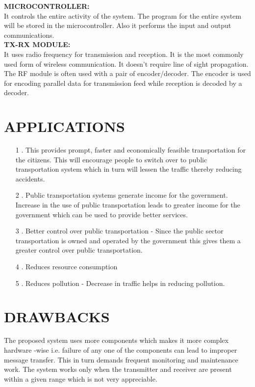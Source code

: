 \documentclass[12pt,a4paper,oneside]{report}
\begin{document}
\begin{onehalfspacing}
\textbf{MICROCONTROLLER:}\\
 It controls the entire activity of the system. The program for the entire system will be stored in the microcontroller. Also it performs the input and output communications. \\
 
\textbf{TX-RX  MODULE:}\\
It uses radio frequency for transmission and reception. It is the most commonly used form of wireless communication. It doesn't require line of sight propagation. The RF module is often used with a pair of encoder/decoder. The encoder is used for encoding parallel data for transmission feed while reception is decoded by a decoder.  \\



\section{APPLICATIONS}
\par
\hspace{.7cm}
\begin{enumerate}	
\item[1]. This provides prompt, faster and economically feasible transportation for the citizens. This will encourage people to switch over to public transportation system which in turn will lessen the traffic thereby reducing accidents.
\item[2]. Public transportation systems generate income for the government. Increase in the use of public transportation leads to greater income for the government which can be used to provide better services.
\item[3]. Better control over public transportation - Since the public sector transportation is owned and operated by the government this gives them a greater control over public transportation.
\item[4]. Reduces resource consumption
\item[5]. Reduces pollution - Decrease in traffic helps in reducing pollution.
\end{enumerate}

\section{DRAWBACKS}
\par
\hspace{.7cm}
 The proposed system uses more components which makes it more complex hardware -wise i.e. failure of any one of the components can lead to improper message transfer. This in turn demands frequent monitoring and maintenance work.
The system works only when the transmitter and receiver are present within a given range which is not very appreciable.


\end{onehalfspacing}
\end{document}
